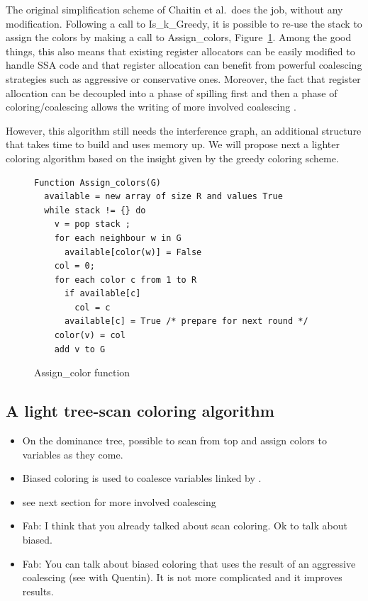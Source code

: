 {The original simplification scheme of Chaitin et al.\ does the job, without any modification. 
Following a call to Is\_k\_Greedy, it is possible to re-use the stack to assign the colors by making a call to Assign\_colors, Figure~\ref{code:assign-color}. 
Among the good things, this also means that existing register allocators can be easily modified to handle SSA code and that register allocation can benefit from powerful coalescing strategies such as aggressive or conservative ones. 
Moreover, the fact that register allocation can be decoupled into a phase of spilling first and then a phase of coloring/coalescing allows the writing of more involved coalescing .


However, this algorithm still needs the interference graph, an additional structure that takes time to build and uses memory up.
We will propose next a lighter coloring algorithm based on the insight given by the greedy coloring scheme.





\begin{figure}
\begin{verbatim}
Function Assign_colors(G)
  available = new array of size R and values True
  while stack != {} do
    v = pop stack ;
    for each neighbour w in G
      available[color(w)] = False
    col = 0;
    for each color c from 1 to R
      if available[c]
        col = c
      available[c] = True /* prepare for next round */
    color(v) = col
    add v to G
\end{verbatim}
\caption{Assign\_color function}
\label{code:assign-color}
\end{figure}



\subsection{A light tree-scan coloring algorithm}
{\sl
\begin{itemize}
  \item On the dominance tree, possible to scan from top and assign colors to 
    variables as they come.
  \item Biased coloring is used to coalesce variables linked by \phifuns.
  \item see next section for more involved coalescing
  \item Fab: I think that you already talked about scan coloring. Ok to talk about biased.
  \item Fab: You can talk about biased coloring that uses the result of an aggressive coalescing (see with Quentin). It is not more complicated and it improves results.
\end{itemize}
}

}
